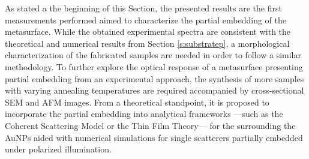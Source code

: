 As stated a the beginning of this Section, the presented results are the first measurements performed aimed to characterize the partial embedding  of the metasurface. While the obtained experimental spectra are consistent with the theoretical and numerical results from Section \ref{s:substratep},  a  morphological characterization of the fabricated samples are needed in order to follow a similar methodology. To further explore the optical response of a metasurface presenting partial embedding from an experimental  approach, the synthesis of more samples with varying annealing temperatures are required accompanied by cross-sectional SEM and AFM images. From a theoretical standpoint, it is proposed to incorporate the partial embedding into analytical frameworks ---such as the Coherent Scattering Model or the Thin Film Theory--- for the surrounding the AuNPs aided with numerical simulations for single scatterers partially embedded under polarized illumination.